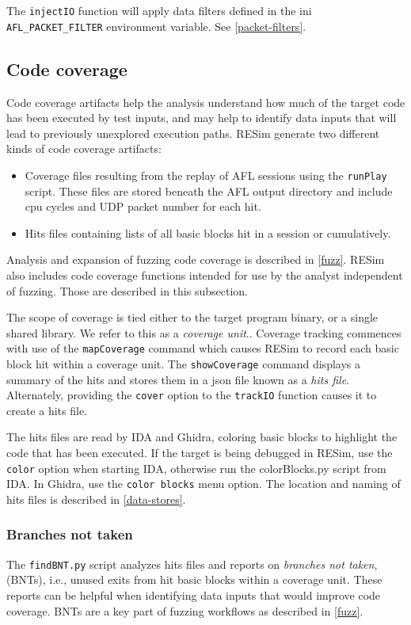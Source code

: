 \documentclass[titlepage]{article}
\begin{document}
The {\tt injectIO} function will apply data filters defined in the ini {\tt AFL\_PACKET\_FILTER} environment variable.  See \ref{packet-filters}.

\subsection{Code coverage}
\label{coverage}
Code coverage artifacts help the analysis understand how much of the target code has been executed by test inputs, and may help to identify data inputs
that will lead to previously unexplored execution paths.
RESim generate two different kinds of code coverage artifacts:
\begin{itemize}
\item Coverage files resulting from the replay of AFL sessions using the {\tt runPlay} script.  These files are stored beneath the AFL output directory
and include cpu cycles and UDP packet number for each hit. 
\item Hits files containing lists of all basic blocks hit in a session or cumulatively.
\end{itemize}

Analysis and expansion of fuzzing code coverage is described in \ref{fuzz}.  RESim also includes code coverage functions intended for use
by the analyst independent of fuzzing.  Those are described in this subsection.  

The scope of coverage is tied either to the target program binary, or a single shared library.  We refer to this as a \textit{coverage unit}..  
Coverage tracking commences with use of the {\tt mapCoverage} command which causes RESim to record each basic block hit within a coverage unit.
The {\tt showCoverage} command displays a summary of the hits and stores them in a json file known as a \textit {hits file}.  
Alternately, providing the {\tt cover} option to the {\tt trackIO} function causes it to create a hits file.

The hits files are read by IDA and Ghidra, coloring basic blocks to highlight the code that has been executed. If the target is being debugged in RESim,
use the {\tt color} option when starting IDA, otherwise run the colorBlocks.py script from IDA.  In Ghidra, use the {\tt color blocks} menu option.
The location and naming of hits files is described in \ref{data-stores}.

\subsubsection{Branches not taken}
The {\tt findBNT.py} script analyzes hits files and reports on \textit{branches not taken}, (BNTs), i.e., unused exits from hit basic blocks within a coverage unit.
These reports can be helpful when identifying data inputs that would improve code coverage.  BNTs are a key part of fuzzing workflows as described in \ref{fuzz}.
\end{document}
